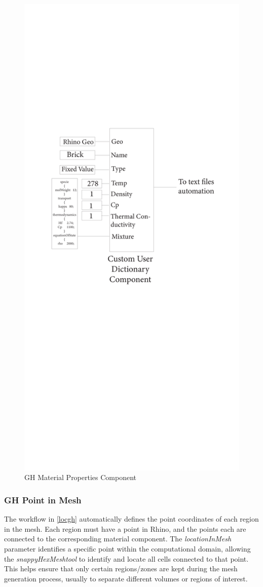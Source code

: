 \begin{figure}[H]
\centering
\includegraphics[trim=5cm 32cm 4.5cm 7cm, clip, width=0.55\linewidth]{Figures/THESISGH2.pdf}
\hspace{0.7cm}
\caption{\gls{GH} Material Properties Component}
\label{matgh}
\end{figure}





\subsubsection{\gls{GH} Point in Mesh}
The workflow in \ref{locgh} automatically defines the point coordinates of each region in the mesh. Each region must have a point in Rhino, and the points each are connected to the corresponding material component. The \textit{locationInMesh} parameter identifies a specific point within the computational domain, allowing the \textit{snappyHexMeshtool} to identify and locate all cells connected to that point. This helps ensure that only certain regions/zones are kept during the mesh generation process, usually to separate different volumes or regions of interest.


